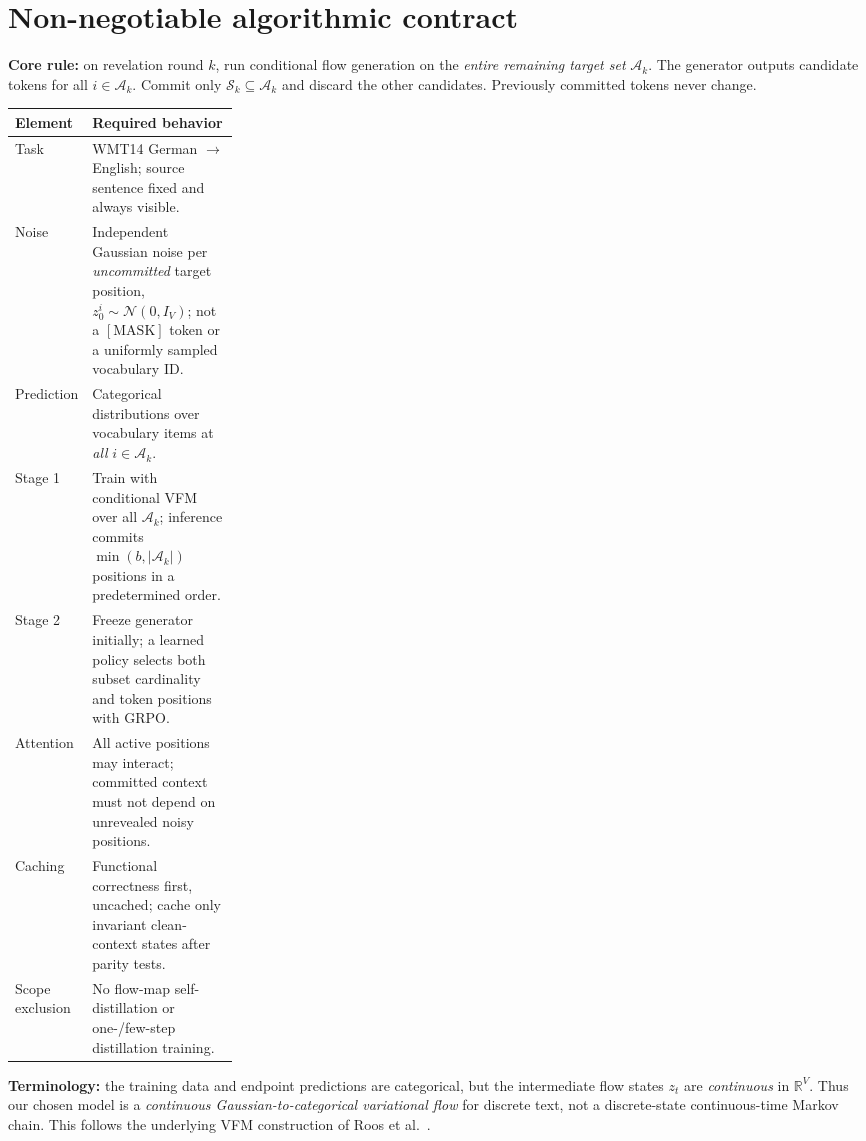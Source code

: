 \documentclass[11pt,a4paper]{article}
\newcommand{\A}{\mathcal A}
\newcommand{\Sset}{\mathcal S}
\newcommand{\N}{\mathcal N}
\begin{document}
\section{Non-negotiable algorithmic contract}
\textbf{Core rule:} on revelation round $k$, run conditional flow generation on the \emph{entire remaining target set} $\A_k$. The generator outputs candidate tokens for all $i\in\A_k$. Commit only $\Sset_k\subseteq\A_k$ and discard the other candidates. Previously committed tokens never change.
\begin{center}
\begin{tabularx}{\linewidth}{@{}p{0.26\linewidth}X@{}}\toprule
Element & Required behavior \\ \midrule
Task & WMT14 German $\rightarrow$ English; source sentence fixed and always visible. \\
Noise & Independent Gaussian noise per \emph{uncommitted} target position, $z_0^i\sim\N(0,I_V)$; not a $[\mathrm{MASK}]$ token or a uniformly sampled vocabulary ID. \\
Prediction & Categorical distributions over vocabulary items at \emph{all} $i\in\A_k$. \\
Stage 1 & Train with conditional VFM over all $\A_k$; inference commits $\min(b,|\A_k|)$ positions in a predetermined order. \\
Stage 2 & Freeze generator initially; a learned policy selects both subset cardinality and token positions with GRPO. \\
Attention & All active positions may interact; committed context must not depend on unrevealed noisy positions. \\
Caching & Functional correctness first, uncached; cache only invariant clean-context states after parity tests. \\
Scope exclusion & No flow-map self-distillation or one-/few-step distillation training. \\ \bottomrule
\end{tabularx}
\end{center}
\textbf{Terminology:} the training data and endpoint predictions are categorical, but the intermediate flow states $z_t$ are \emph{continuous} in $\mathbb R^V$. Thus our chosen model is a \emph{continuous Gaussian-to-categorical variational flow} for discrete text, not a discrete-state continuous-time Markov chain. This follows the underlying VFM construction of Roos et al.~\cite{roos2026}.
\end{document}
